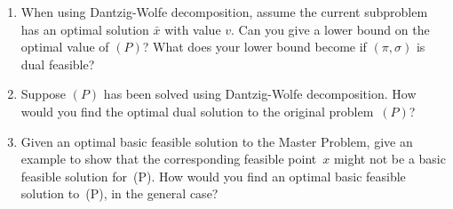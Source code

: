 \documentclass[12pt]{article}
\begin{document}
\begin{enumerate}
  \item
    When using Dantzig-Wolfe decomposition,
    assume the current subproblem has an optimal solution $\bar{x}$ with value
    $v$.  Can you give a lower bound on the optimal value of $(P)$?
    What does your lower bound become if $(\pi,\sigma)$ is dual feasible?
\item
    Suppose $(P)$ has been solved using Dantzig-Wolfe decomposition.
    How would you find
    the optimal dual solution to the original problem~$(P)$?
\item
    Given an optimal basic feasible solution to the Master Problem, give an example to
    show that the corresponding
    feasible point~$x$ might not be a basic feasible solution for~(P).
    How would you find an optimal basic feasible solution to~(P), in the general case?

\end{enumerate}
\end{document}
